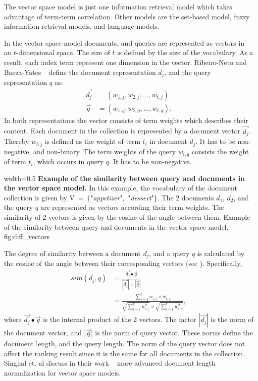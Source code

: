 The vector space model is just one information retrieval model which takes advantage of term-term correlation. Other models are the set-based model, fuzzy information retrieval models, and language models.

In the vector space model documents, and queries are represented as vectors in an $t$-dimensional space. The size of $t$ is defined by the size of the vocabulary. As a result, each index term represent one dimension in the vector. Ribeiro-Neto and Baeza-Yates ~\cite{ModernInvormationRetrieval1999} define the document representation $d_j$, and the query representation $q$ as:
\begin{align}
  \vec{d_j} & = (w_{1, j}, w_{2, j}, \dots, w_{t, j}) \\
  \vec{q} & = (w_{1, q}, w_{2, q}, \dots, w_{t, q}).
\end{align}
In both representations the vector consists of term weights which describes their content. Each document in the collection is represented by a document vector $\vec{d_j}$. Thereby $w_{i,j}$ is defined as the weight of term $t_i$ in document $d_j$. It has to be non-negative, and non-binary. The term weights of the query $w_{i, q}$ consists the weight of term $t_i$, which occurs in query $q$. It has to be non-negative.

      {width=0.5\textwidth}
      {\textbf{Example of the similarity between query and documents in the vector space model.} In this example, the vocabulary of the document collection is given by \mbox{V = \{"\textit{appetizer}", "\textit{dessert}"\}}. The $2$ documents $d_1$, $d_2$, and the query $q$ are represented as vectors according their term weights. The similarity of $2$ vectors is given by the cosine of the angle between them.}
      {Example of the similarity between query and documents in the vector space model.}
      {fig:diff_vectors}

The degree of similarity between a document $d_j$, and a query $q$ is calculated by the cosine of the angle between their corresponding vectors (see ). Specifically,
\begin{equation}
  \label{vector_space_similarity}
  \begin{split}
    sim(d_j, q) & = \frac{\vec{d_j} \bullet \vec{q}}{|\vec{d_j}| \times |\vec{q}|} \\
    & = \frac{\sum_{i = 1}^t w_{i, j} \times w_{i, q}}{\sqrt{\sum_{i = 1}^t w_{i, j}^2} \times \sqrt{\sum_{i = 1}^t w_{i, q}^2}},
  \end{split}
\end{equation}
where $\vec{d_j} \bullet \vec{q}$ is the internal product of the $2$ vectors. The factor $|\vec{d_j}|$ is the norm of the document vector, and $|\vec{q}|$ is the norm of query vector. These norms define the document length, and the query length. The norm of the query vector does not affect the ranking result since it is the same for all documents in the collection. Singhal et. al discuss in their work ~\cite{SinghalBM96} more advanced document length normalization for vector space models.

